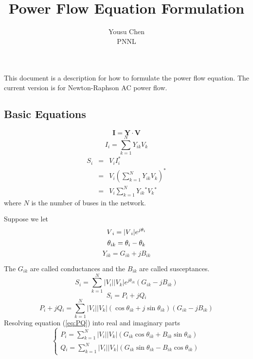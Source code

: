 \documentclass[12pt]{article}
\begin{document}
\title{Power Flow Equation Formulation}
\author{Yousu Chen \\PNNL}
\maketitle
This document is a description for how to formulate the power flow equation. The current version is for Newton-Raphson AC power flow.

\subsection*{Basic Equations}
\begin{equation}\label{eq:IYV}
\mathbf{I}=\mathbf{Y}\cdot\mathbf{V}
\end{equation} 
\begin{equation}\label{eq:Ik}
I_{i}=\sum_{k=1}^{N}Y_{ik}V_{k}
\end{equation} 
\begin{eqnarray}\label{eq:Sk}
S{_i}&=& V{_i}I_{i}^{*} \nonumber \\
     &=& V{_i}\left ( \sum_{k=1}^{N}Y{_{ik}}V{_k} \right )^{*}  \nonumber \\          
     &=& V{_i}\sum_{k=1}^{N}Y{_{ik}}^{*}V{_k}^{*}
\end{eqnarray} 
where $N$ is the number of buses in the network.

Suppose we let 
\begin{equation}
V{_i}= |V{_i}|e^{j\theta_{i}}  \\
\end{equation} 
\begin{equation}
\theta_{ik}=\theta_{i}-\theta_{k} \\
\end{equation} 
\begin{equation}
Y_{ik}=G_{ik}+jB_{ik}
\end{equation} 

The $G_{ik}$ are called conductances and the $B_{ik}$ are called susceptances. 
\begin{equation}\label{eq:S}
S{_i}=\sum_{k=1}^{N}|V{_i}||V{_k}|e^{j\theta_{ik}}\left ( G_{ik}-jB_{ik} \right )
\end{equation} 
\begin{equation}
S{_i}=P{_i}+jQ{_i}
\end{equation} 
\begin{equation}\label{eq:PQ}
P{_i}+jQ{_i}=\sum_{k=1}^{N}|V{_i}||V{_k}|\left ( \cos\theta_{ik}+j\sin\theta_{ik} \right )\left ( G_{ik}-jB_{ik} \right )
\end{equation} 
Resolving equation (\ref{eq:PQ}) into real and imaginary parts
\begin{equation}\label{eq:PiQi}
\begin{cases}
P{_i}=\sum_{k=1}^{N}|V{_i}||V{_k}|\left (G_{ik}\cos\theta_{ik}+B_{ik}\sin\theta_{ik} \right ) \\
Q{_i}=\sum_{k=1}^{N}|V{_i}||V{_k}|\left (G_{ik}\sin\theta_{ik}-B_{ik}\cos\theta_{ik} \right )
\end{cases}
\end{equation} 
\end{document}

